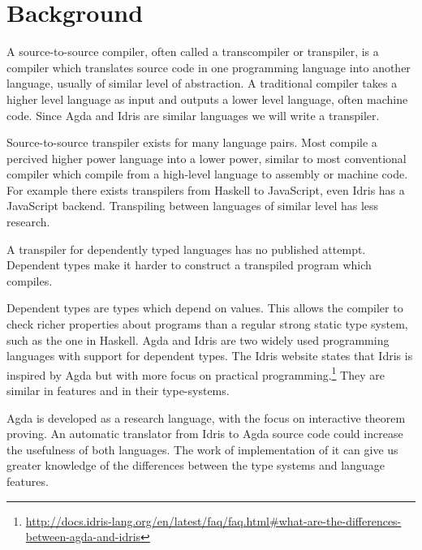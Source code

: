 \documentclass[parskip=half]{scrartcl}
\begin{document}
\section{Background}

A source-to-source compiler, often called a transcompiler or transpiler, is
a compiler which translates source code in one programming language into
another language, usually of similar level of abstraction. A traditional
compiler takes a higher level language as input and outputs a lower level
language, often machine code.  Since Agda and Idris are similar languages we will write a transpiler.

Source-to-source transpiler exists for many language pairs. Most compile
a percived higher power language into a lower power, similar to most
conventional compiler which compile from a high-level language to assembly or
machine code. For example there exists transpilers from Haskell to JavaScript,
even Idris has a JavaScript backend. Transpiling between languages of similar
level has less research.

A transpiler for dependently typed languages has no published attempt.
Dependent types make it harder to construct a transpiled program which
compiles.



Dependent types are types which depend on values. This allows the compiler to
check richer properties about programs than a regular strong static type
system, such as the one in Haskell.
Agda and Idris are two widely used programming languages with support for dependent types.
The Idris website states that Idris is inspired
by Agda but with more focus on practical
programming.\footnote{\url{http://docs.idris-lang.org/en/latest/faq/faq.html\#what-are-the-differences-between-agda-and-idris}}
They are similar in features and in their type-systems.

Agda is developed as a research language, with the focus on interactive theorem
proving.  An automatic translator from Idris to Agda source code could increase
the usefulness of both languages. The work of implementation of it can give us
greater knowledge of the differences between the type systems and language
features.
\end{document}
